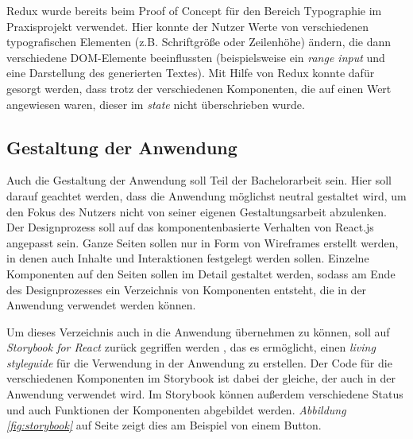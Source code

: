 Redux wurde bereits beim Proof of Concept für den Bereich Typographie im Praxisprojekt verwendet. Hier konnte der Nutzer Werte von verschiedenen typografischen Elementen (z.B. Schriftgröße oder Zeilenhöhe) ändern, die dann verschiedene DOM-Elemente beeinflussten (beispielsweise ein \textit{range input} und eine Darstellung des generierten Textes). Mit Hilfe von Redux konnte dafür gesorgt werden, dass trotz der verschiedenen Komponenten, die auf einen Wert angewiesen waren, dieser im \textit{state} nicht überschrieben wurde.

\subsection{Gestaltung der Anwendung}
Auch die Gestaltung der Anwendung soll Teil der Bachelorarbeit sein. Hier soll darauf geachtet werden, dass die Anwendung möglichst neutral gestaltet wird, um den Fokus des Nutzers nicht von seiner eigenen Gestaltungsarbeit abzulenken.\\
Der Designprozess soll auf das komponentenbasierte Verhalten von React.js angepasst sein. Ganze Seiten sollen  nur in Form von Wireframes erstellt werden, in denen auch Inhalte und Interaktionen festgelegt werden sollen. Einzelne Komponenten auf den Seiten sollen im Detail gestaltet werden, sodass am Ende des Designprozesses ein Verzeichnis von Komponenten entsteht, die in der Anwendung verwendet werden können.

Um dieses Verzeichnis auch in die Anwendung übernehmen zu können, soll auf \textit{Storybook for React} zurück gegriffen werden \cite{StorybooksOnline}, das es ermöglicht, einen \textit{living styleguide} für die Verwendung in der Anwendung zu erstellen. Der Code für die verschiedenen Komponenten im Storybook ist dabei der gleiche, der auch in der Anwendung verwendet wird. Im Storybook können außerdem verschiedene Status und auch Funktionen der Komponenten abgebildet werden. \textit{Abbildung \ref{fig:storybook}} auf Seite \pageref{fig:storybook} zeigt dies am Beispiel von einem Button.

